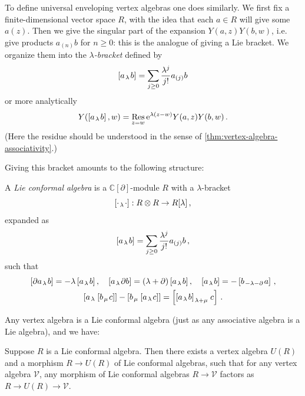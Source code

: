 \documentclass[12pt,letterpaper,reqno]{amsart}
\numberwithin{equation}{section}
\newcommand{\bbC}{\ensuremath{\mathbb C}}
\newcommand{\lb}[3]{\left[#1_{\mkern2mu #2 \mkern2mu} #3\right]}
\newcommand{\e}{{\mathrm e}}
\newcommand\bid{{\mathbf 1}}
\newcommand{\vertex}{\mathcal{V}}
\newcommand{\ti}[1]{\textit{#1}}
\DeclareMathOperator{\Res}{Res}
\begin{document}
To define universal enveloping vertex algebras one does similarly.
We first fix a finite-dimensional vector space $R$, with the idea that
each $a \in R$ will give some $a(z)$.
Then we give the singular part of the expansion $Y(a,z) Y(b,w)$, 
i.e. give products $a_{(n)} b$ for $n \ge 0$: this is the analogue of
giving a Lie bracket. We organize them into
the \ti{$\lambda$-bracket} defined by
\begin{equation}
  \lb{a}{\lambda}{b} = \sum_{j \ge 0} \frac{\lambda^j}{j!} a_{(j)} b
\end{equation}
or more analytically
\begin{equation}
  Y(\lb{a}{\lambda}{b},w) = \Res_{z = w} \e^{\lambda(z-w)} Y(a,z) Y(b,w) \, .
\end{equation}
(Here the residue should be understood in the sense of \autoref{thm:vertex-algebra-associativity}.)

Giving this bracket amounts to the following structure:

\begin{defn}
A \ti{Lie conformal algebra} is a $\bbC[\partial]$-module $R$
with a $\lambda$-bracket
\begin{equation}
  \lb{\cdot}{\lambda}{\cdot}: R \otimes R \to R[\lambda] \, ,
\end{equation}
expanded as
\begin{equation}
  \lb{a}{\lambda}{b} = \sum_{j \ge 0} \frac{\lambda^j}{j!} a_{(j)} b \, ,
\end{equation}
such that
\begin{gather}
  \lb{\partial a}{\lambda}{b} = -\lambda \lb{a}{\lambda}{b}, \quad \lb{a}{\lambda}{\partial b} = (\lambda + \partial)\lb{a}{\lambda}{b}, \quad \lb{a}{\lambda}{b} = -\lb{b}{-\lambda-\partial}{a} \, , \\
  \lb{a}{\lambda}{\lb{b}{\mu}{c}} - \lb{b}{\mu}{\lb{a}{\lambda}{c}} = \lb{\lb{a}{\lambda}{b}}{\lambda+\mu}{c} \, .
\end{gather}
\end{defn}

Any vertex algebra is a Lie conformal algebra (just as any associative algebra is a Lie algebra),
and we have:

\begin{prop}
Suppose $R$ is a Lie conformal algebra. Then there exists
a vertex algebra $U(R)$ and a morphism $R \to U(R)$ of Lie conformal algebras,
such that for any  
vertex algebra $\vertex$, any morphism
of Lie conformal algebras $R \to \vertex$
factors as $R \to U(R) \to \vertex$.
\end{prop}
\end{document}
